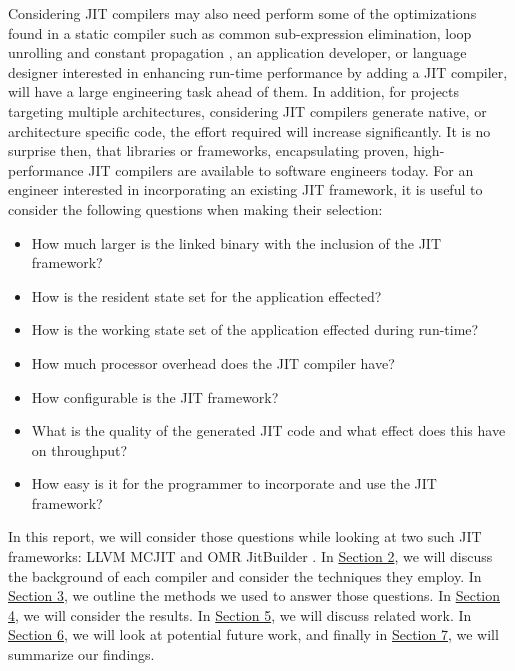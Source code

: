 Considering JIT compilers may also need perform some of the optimizations found in a static compiler such as common sub-expression elimination, loop unrolling and constant propagation \cite{10.5555/2737838}, an application developer, or language designer interested in enhancing run-time performance by adding a JIT compiler, will have a large engineering task ahead of them.
In addition, for projects targeting multiple architectures, considering JIT compilers generate native, or architecture specific code, the effort required will increase significantly.
It is no surprise then, that libraries or frameworks, encapsulating proven, high-performance JIT compilers are available to software engineers today.
For an engineer interested in incorporating an existing JIT framework, it is useful to consider the following questions when making their selection: 
\begin{itemize}
    \item How much larger is the linked binary with the inclusion of the JIT framework?
    \item How is the resident state set for the application effected?
    \item How is the working state set of the application effected during run-time?
    \item How much processor overhead does the JIT compiler have?
    \item How configurable is the JIT framework?
    \item What is the quality of the generated JIT code and what effect does this have on throughput?
    \item How easy is it for the programmer to incorporate and use the JIT framework?
\end{itemize} 

In this report, we will consider those questions while looking at two such JIT frameworks: LLVM MCJIT \cite{LLVM} and OMR JitBuilder \cite{10.5555/3172795.3172842}.
In \hyperref[sec:background]{Section 2}, we will discuss the background of each compiler and consider the techniques they employ.
In \hyperref[sec:methodology]{Section 3}, we outline the methods we used to answer those questions.
In \hyperref[sec:results]{Section 4}, we will consider the results.
In \hyperref[sec:related-work]{Section 5}, we will discuss related work.
In \hyperref[sec:future-work]{Section 6}, we will look at potential future work, and finally in \hyperref[sec:summary]{Section 7}, we will summarize our findings.


